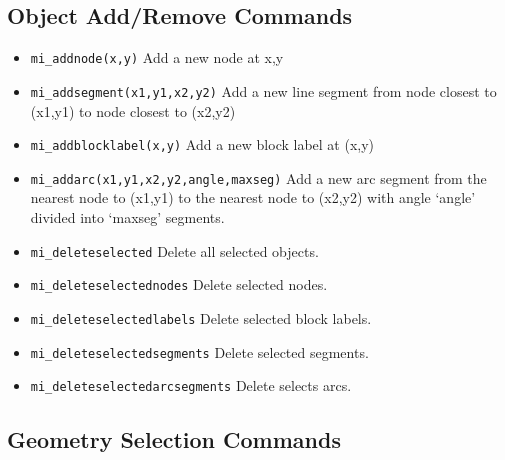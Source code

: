 \subsection{Object Add/Remove Commands}

\begin{itemize}

\item{\tt mi\_addnode(x,y)} Add a new node at x,y

\item{\tt mi\_addsegment(x1,y1,x2,y2)} Add a new line segment from node
closest to (x1,y1) to node closest to (x2,y2)

\item{\tt mi\_addblocklabel(x,y)} Add a new block label at (x,y)

\item{\tt mi\_addarc(x1,y1,x2,y2,angle,maxseg)} Add a new arc segment
from the nearest node to (x1,y1) to the nearest node to (x2,y2)
with angle `angle' divided into `maxseg' segments.

\item{\tt mi\_deleteselected} Delete all selected objects.

\item{\tt mi\_deleteselectednodes} Delete selected nodes.

\item{\tt mi\_deleteselectedlabels} Delete selected block labels.

\item{\tt mi\_deleteselectedsegments} Delete selected segments.

\item{\tt mi\_deleteselectedarcsegments} Delete selects arcs.
\end{itemize}

\subsection{Geometry Selection Commands}

